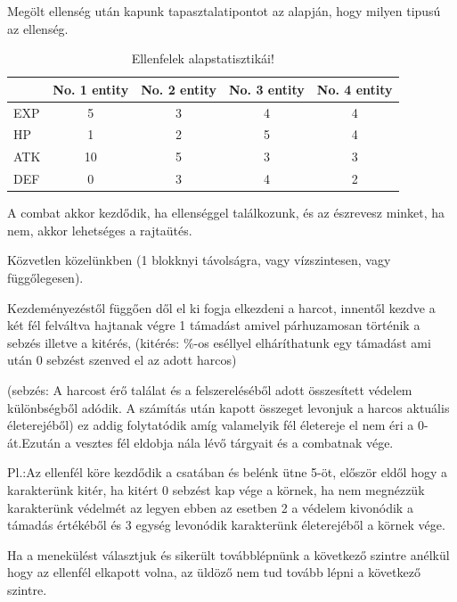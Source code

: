 Megölt ellenség után kapunk tapasztalatipontot az alapján, hogy milyen tipusú az ellenség.


\begin{table}[h]
\centering
\caption{Ellenfelek alapstatisztikái!}
\label{tab:minta}
\begin{tabular}{|l|c|c|c|c|}
\hline
 & No. 1 entity & No. 2 entity & No. 3 entity & No. 4 entity  \\
\hline
EXP & 5 & 3 & 4 & 4 \\
\hline
HP & 1 & 2 & 5 & 4 \\
\hline
ATK & 10 & 5 & 3 & 3 \\
\hline
DEF & 0 & 3 & 4 & 2 \\
\hline
\end{tabular}
\end{table}


A combat akkor kezdődik, ha ellenséggel találkozunk, és az észrevesz minket, ha nem, akkor lehetséges a rajtaütés.


Közvetlen közelünkben (1 blokknyi távolságra, vagy vízszintesen, vagy függőlegesen).

Kezdeményezéstől függően dől el ki fogja elkezdeni a harcot, innentől kezdve a két fél felváltva hajtanak végre 1 támadást amivel párhuzamosan történik a sebzés illetve a kitérés, (kitérés: \%-os eséllyel elháríthatunk egy támadást ami után 0 sebzést szenved el az adott harcos)

(sebzés: A harcost érő találat és a felszereléséből adott összesített védelem különbségből adódik. A számítás után kapott összeget levonjuk a harcos aktuális életerejéből) ez addig folytatódik amíg valamelyik fél életereje el nem éri a 0-át.Ezután a vesztes fél eldobja nála lévő tárgyait és a combatnak vége.


Pl.:Az ellenfél köre kezdődik a csatában és belénk ütne 5-öt, először eldől hogy a karakterünk kitér, ha kitért 0 sebzést kap vége a körnek, ha nem megnézzük karakterünk védelmét az legyen ebben az esetben 2 a védelem kivonódik a támadás értékéből és 3 egység levonódik karakterünk életerejéből a körnek vége.

Ha a menekülést választjuk és sikerült továbblépnünk a következő szintre anélkül hogy az ellenfél elkapott volna, az üldöző nem tud tovább lépni a következő szintre.

